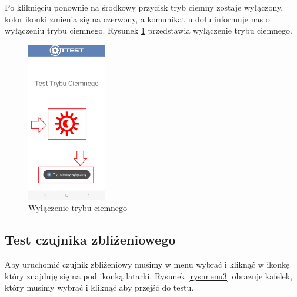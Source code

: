 Po kliknięciu ponownie na środkowy przycisk tryb ciemny zostaje wyłączony, kolor ikonki zmienia się na czerwony, a komunikat u dołu informuje nas o wyłączeniu trybu ciemnego. Rysunek \ref{rys:tryb ciemny1} przedstawia wyłączenie trybu ciemnego. 

\begin{figure}[!hbt]
	\begin{center}
		\includegraphics[angle=360, width=0.31\textwidth]{rys/punkt6/tryb ciemny1.png}
		\caption{Wyłączenie trybu ciemnego}
		\label{rys:tryb ciemny1}
	\end{center}
\end{figure}

\newpage


\subsection{Test czujnika zbliżeniowego}

\hspace{0.60cm}Aby uruchomić czujnik zbliżeniowy musimy w menu wybrać i kliknąć w ikonkę który znajduję się na pod ikonką latarki. Rysunek \ref{rys:menu3} obrazuje kafelek, który musimy wybrać i kliknąć aby przejść do testu.

